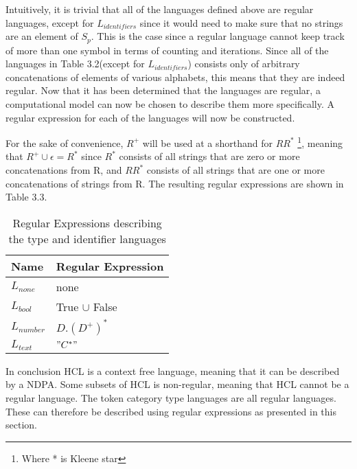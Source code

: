 Intuitively, it is trivial that all of the languages defined above are regular languages, except for $L_{identifiers}$ since it would need to make sure that no strings are an element of $S_p$.
This is the case since a regular language cannot keep track of more than one symbol in terms of counting and iterations.
Since all of the languages in Table 3.2(except for $L_{identifiers}$) consists only of arbitrary concatenations of elements of various alphabets, this means that they are indeed regular. 
Now that it has been determined that the languages are regular, a computational model can now be chosen to describe them more specifically.
A regular expression for each of the languages will now be constructed.

For the sake of convenience, $R^+$ will be used at a shorthand for $RR^*$ \footnote{Where * is Kleene star}, meaning that $R^+ \cup \epsilon = R^*$ since $R^*$ consists of all strings that are zero or more concatenations from R, and $RR^*$ consists of all strings that are one or more concatenations of strings from R.
The resulting regular expressions are shown in Table 3.3.

\begin{table}[!htb]
	\centering
	\label{my-label}
	\begin{tabular}{|l|l|}
		\hline
		\textbf{Name}     & \textbf{Regular Expression}         \\ \hline
		$L_{none}$        & none                                \\ \hline
		$L_{bool}$        & True $\cup$ False                   \\ \hline
		$L_{number}$      & $D.(D^+)^*$                       \\ \hline
		$L_{text}$        & $"C^*"$                               \\ \hline
	\end{tabular}
	\caption{Regular Expressions describing the type and identifier languages}
\end{table}

In conclusion HCL is a context free language, meaning that it can be described by a NDPA.
Some subsets of HCL is non-regular, meaning that HCL cannot be a regular language.
The token category type languages are all regular languages. 
These can therefore be described using regular expressions as presented in this section.



